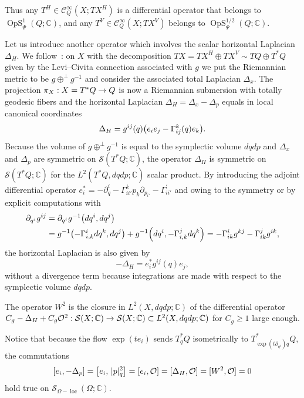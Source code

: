\documentclass[AHL,Unicode,longabstracts]{cedram}
\newcommand{\C}{\mathbb{C}}
\newcommand{\clC}{\mathcal{C}}
\newcommand{\clO}{\mathcal{O}}
\newcommand{\clS}{\mathcal{S}}
\DeclareMathOperator{\OpS}{OpS}
\DeclareMathOperator{\locc}{loc}
\let\originalleft\left
\let\originalright\right
\renewcommand{\left}{\mathopen{}\mathclose\bgroup\originalleft}
\renewcommand{\right}{\aftergroup\egroup\originalright}
\renewcommand*{\to}{\mathchoice{\longrightarrow}{\rightarrow}{\rightarrow}{\rightarrow}}
\begin{document}
Thus any $T^{H}\in \clC^{\infty}_{Q}(X;TX^{H})$ is a differential operator that belongs to $\OpS_{\Psi}^{1}(Q;\C)$, and any $T^{V}\in \clC^{\infty}_{Q}(X;TX^{V})$ belongs to $\OpS^{1/2}_{\Psi}(Q;\C)$.

Let us introduce another operator which involves the scalar horizontal Lapla\-cian~$\Delta_{H}$. We follow~\cite{BeBo}: on $X$ with the decomposition $TX=TX^{H}\oplus TX^{V}\sim TQ\oplus T^{*}Q$ given by the Levi--Civita connection associated with $g$ we put the Riemannian metric to be $g\oplus^{\perp}g^{-1}$ and consider the associated total Lapla\-cian $\Delta_{x}$. The projection $\pi_{X}:X=T^{*}Q\to Q$ is now a Riemannian submersion with totally geodesic fibers and the horizontal Laplacian $\Delta_{H}=\Delta_{x}-\Delta_{p}$ equals in local canonical coordinates
\[
\Delta_{H}=g^{ij}(q)\left(e_{i}e_{j}-\Gamma_{ij}^{k}(q)e_{k}\right).
\]
Because the volume of $g\oplus^{\perp} g^{-1}$ is equal to the symplectic volume $dqdp$ and $\Delta_{x}$ and $\Delta_{p}$ are symmetric on $\clS(T^{*}Q;\C)$, the operator $\Delta_{H}$ is symmetric on $\clS(T^{*}Q;\C)$ for the $L^{2}(T^{*}Q,dqdp;\C)$ scalar product. By introducing the adjoint differential operator $e_{i}^{*}=-\partial_{q}^{i}-\Gamma_{ii'}^{k}p_{k}\partial_{p_{i'}}-\Gamma_{ii'}^{'}$ and owing to the symmetry or by explicit computations with
\begin{align*}
\partial_{q^{i}}g^{ij}&=\partial_{q^{i}}g^{-1}\left(dq^{i},dq^{j}\right)\\ &=g^{-1}\left(-\Gamma_{i,k}^{i}dq^{k},dq^{j}\right)+g^{-1}\left(dq^{i}, -\Gamma_{i,k}^{j}dq^{k}\right) =-\Gamma_{ik}^{i}g^{kj}-\Gamma_{ik}^{j}g^{ik},
\end{align*}
the horizontal Laplacian is also given by
\[
-\Delta_{H}=e_{i}^{*}g^{ij}(q)e_{j},
\]
without a divergence term because integrations are made with respect to the symplectic volume $dqdp$.
\begin{defi}\label{de:W2}
The operator $W^{2}$ is the closure in $L^{2}(X,dqdp;\C)$ of the differential operator $C_{g}-\Delta_{H}+C_{g}\clO^{2}:\clS(X;\C)\to \clS(X;\C)\subset L^{2}(X,dqdp;\C)$ for $C_{g}\geq 1$ large enough.
\end{defi}

Notice that because the flow $\exp(te_{i})$ sends $T^{*}_{q}Q$ isometrically to $T^{*}_{\exp(t\partial_{q^{i}})q}Q$, the commutations
\[
[e_{i},-\Delta_{p}]=\left[e_{i},\,|p|_{q}^{2}\right]=[e_{i},\clO]=[\Delta_{H},\clO]=[W^{2},\clO]=0
\]
hold true on $\clS_{\Omega-\locc}(\Omega;\C)$.
\end{document}
